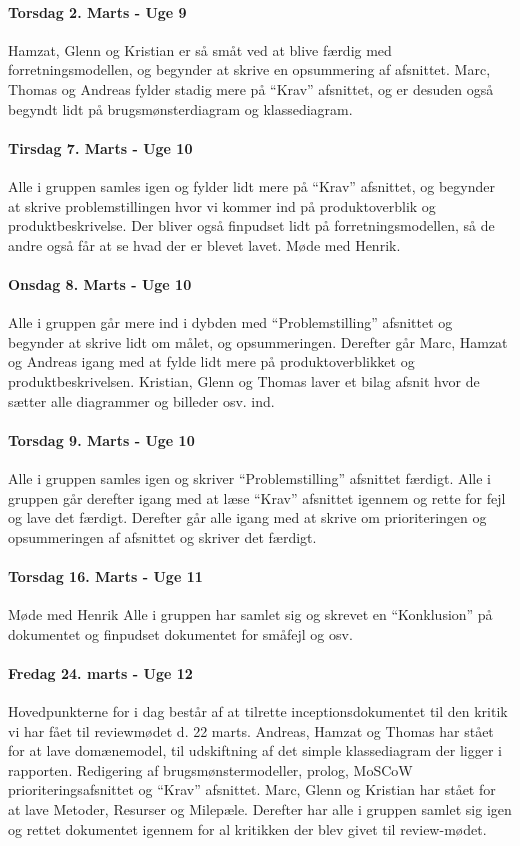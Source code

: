 \paragraph{Torsdag 2. Marts - Uge 9}
Hamzat, Glenn og Kristian er så småt ved at blive færdig med forretningsmodellen, og begynder at skrive en opsummering af afsnittet. Marc, Thomas og Andreas fylder stadig mere på “Krav” afsnittet, og er desuden også begyndt lidt på brugsmønsterdiagram og klassediagram.
 
\paragraph{Tirsdag 7. Marts - Uge 10}
Alle i gruppen samles igen og fylder lidt mere på “Krav” afsnittet, og begynder at skrive problemstillingen hvor vi kommer ind på produktoverblik og produktbeskrivelse. Der bliver også finpudset lidt på forretningsmodellen, så de andre også får at se hvad der er blevet lavet.
Møde med Henrik.
 
\paragraph{Onsdag 8. Marts - Uge 10}
Alle i gruppen går mere ind i dybden med “Problemstilling” afsnittet og begynder at skrive lidt om målet, og opsummeringen. Derefter går Marc, Hamzat og Andreas igang med at fylde lidt mere på produktoverblikket og produktbeskrivelsen. Kristian, Glenn og Thomas laver et bilag afsnit hvor de sætter alle diagrammer og billeder osv. ind.
 
\paragraph{Torsdag 9. Marts - Uge 10}
Alle i gruppen samles igen og skriver “Problemstilling” afsnittet færdigt. Alle i gruppen går derefter igang med at læse “Krav” afsnittet igennem og rette for fejl og lave det færdigt. Derefter går alle igang med at skrive om prioriteringen og opsummeringen af afsnittet og skriver det færdigt.
 
\paragraph{Torsdag 16. Marts - Uge 11}
Møde med Henrik
Alle i gruppen har samlet sig og skrevet en “Konklusion” på dokumentet og finpudset dokumentet for småfejl og osv.
 
\paragraph{Fredag 24. marts - Uge 12}
Hovedpunkterne for i dag består af at tilrette inceptionsdokumentet til den kritik vi har fået til reviewmødet d. 22 marts.
Andreas, Hamzat og Thomas har stået for at lave domænemodel, til udskiftning af det simple klassediagram der ligger i rapporten. Redigering af brugsmønstermodeller, prolog, MoSCoW prioriteringsafsnittet og “Krav” afsnittet.
Marc, Glenn og Kristian har stået for at lave Metoder, Resurser og Milepæle.
Derefter har alle i gruppen samlet sig igen og rettet dokumentet igennem for al kritikken der blev givet til review-mødet.
 
